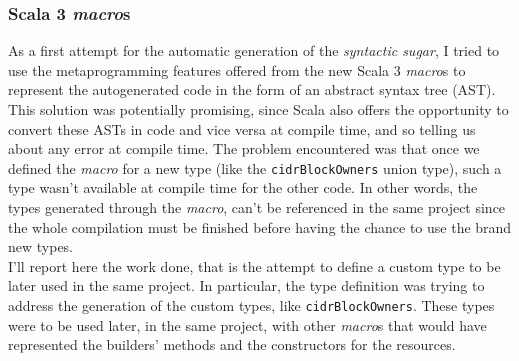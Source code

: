 \subsubsection{Scala 3 \textit{macro}s}
As a first attempt for the automatic generation of the \textit{syntactic sugar}, I tried to use the metaprogramming features offered from the new Scala 3 \textit{macro}s to represent the autogenerated code in the form of an \gls{abstract syntax tree} (AST).
This solution was potentially promising, since Scala also offers the opportunity to convert these ASTs in code and vice versa at compile time, and so telling us about any error at compile time.
The problem encountered was that once we defined the \textit{macro} for a new type (like the \texttt{cidrBlockOwners} union type), such a type wasn't available at compile time for the other code.
In other words, the types generated through the \textit{macro}, can't be referenced in the same project since the whole compilation must be finished before having the chance to use the brand new types.\\
I'll report here the work done, that is the attempt to define a custom type to be later used in the same project.
In particular, the type definition was trying to address the generation of the custom types, like \texttt{cidrBlockOwners}. 
These types were to be used later, in the same project, with other \textit{macro}s that would have represented the builders' methods and the constructors for the resources.

